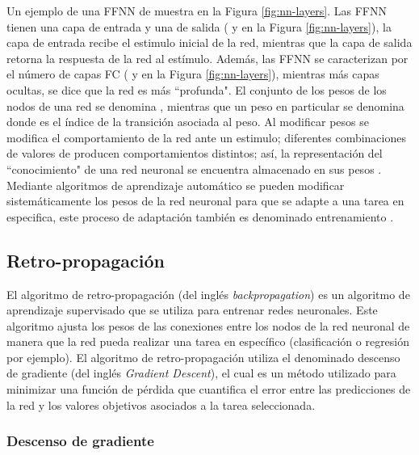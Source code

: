 Un ejemplo de una FFNN de muestra en la Figura \ref{fig:nn-layers}. Las FFNN tienen una capa de entrada y una de salida ( y  en la Figura \ref{fig:nn-layers}), la capa de entrada recibe el estimulo inicial de la red, mientras que la capa de salida retorna la respuesta de la red al estímulo. Además, las FFNN se caracterizan por el número de capas FC ( y  en la Figura \ref{fig:nn-layers}), mientras más capas ocultas, se dice que la red es más ``profunda". El conjunto de los pesos de los nodos de una red se denomina \jim{\theta}, mientras que un peso en particular se denomina  donde  es el índice de la transición asociada al peso. Al modificar pesos \jim{\theta} se modifica el comportamiento de la red ante un estimulo; diferentes combinaciones de valores de \jim{\theta} producen comportamientos distintos; así, la representación del ``conocimiento" de una red neuronal se encuentra almacenado en sus pesos \jim{\theta}. Mediante algoritmos de aprendizaje automático se pueden modificar sistemáticamente los pesos de la red neuronal para que se adapte a una tarea en especifica, este proceso de adaptación también es denominado entrenamiento \cite{Gurney1997}.

\subsection{Retro-propagación}

El algoritmo de retro-propagación (del inglés \textit{backpropagation}) es un algoritmo de aprendizaje supervisado que se utiliza para entrenar redes neuronales. Este algoritmo ajusta los pesos de las conexiones entre los nodos de la red neuronal de manera que la red pueda realizar una tarea en específico (clasificación o regresión por ejemplo). El algoritmo de retro-propagación utiliza el denominado descenso de gradiente (del inglés \textit{Gradient Descent}), el cual es un método utilizado para minimizar una función de pérdida que cuantifica el error entre las predicciones de la red y los valores objetivos asociados a la tarea seleccionada.

\subsubsection*{Descenso de gradiente}

